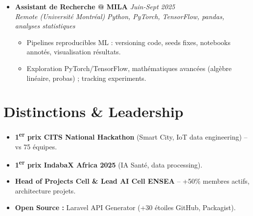 \documentclass[a4paper,11pt]{article}
\begin{document}
\begin{itemize}[leftmargin=*, label=\tiny$\bullet$, nosep]
    \item \textbf{Assistant de Recherche @ MILA} \hfill \textit{Juin-Sept 2025} \\
    \textit{Remote (Universit\'e Montr\'eal)} \hfill \textit{Python, PyTorch, TensorFlow, pandas, analyses statistiques}
    \vspace{-2pt}
    \begin{itemize}[leftmargin=0.4cm, nosep, label=\tiny$\bullet$]
        \item \small{Pipelines reproducibles ML : versioning code, seeds fixes, notebooks annot\'es, visualisation r\'esultats.}
        \item \small{Exploration PyTorch/TensorFlow, math\'ematiques avanc\'ees (alg\`ebre lin\'eaire, probas) ; tracking experiments.}
    \end{itemize}
\end{itemize}

\section{Distinctions \& Leadership}
\begin{itemize}[leftmargin=*, label=\tiny$\bullet$, nosep]
    \item \small{\textbf{1\textsuperscript{er} prix CITS National Hackathon} (Smart City, IoT data engineering) -- vs 75 \'equipes.}
    \item \small{\textbf{1\textsuperscript{er} prix IndabaX Africa 2025} (IA Sant\'e, data processing).}
    \item \small{\textbf{Head of Projects Cell \& Lead AI Cell ENSEA} -- +50\% membres actifs, architecture projets.}
    \item \small{\textbf{Open Source :} Laravel API Generator (+30 \'etoiles GitHub, Packagist).}
\end{itemize}
\end{document}
